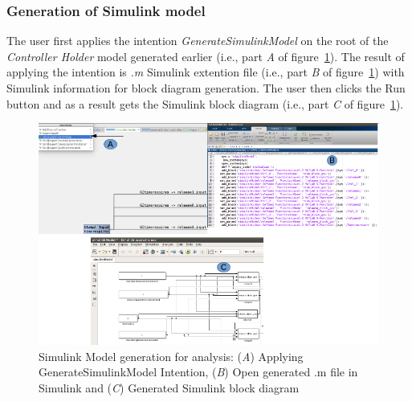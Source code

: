 \subsubsection{Generation of Simulink model}
The user first applies the intention \emph{GenerateSimulinkModel} on the root of
the \emph{Controller Holder} model generated earlier (i.e., part \emph{A} of
figure~\ref{fig:SimulinkModelgeneration}). The result of applying the intention is \emph{.m} Simulink extention file
(i.e., part \emph{B} of figure~\ref{fig:SimulinkModelgeneration}) with Simulink
information for block diagram generation. The user then clicks the Run button
and as a result gets the Simulink block diagram (i.e., part \emph{C} of
figure~\ref{fig:SimulinkModelgeneration}).
\begin{figure}[!h]
\centering
\includegraphics[width=1\textwidth]{./images/SimulinkModelGeneration.png}
\caption{Simulink Model generation for analysis: (\emph{A}) Applying
GenerateSimulinkModel Intention, (\emph{B}) Open generated .m file in Simulink
and (\emph{C}) Generated Simulink block diagram}
\label{fig:SimulinkModelgeneration}
\end{figure}
\vspace{-.5cm}
